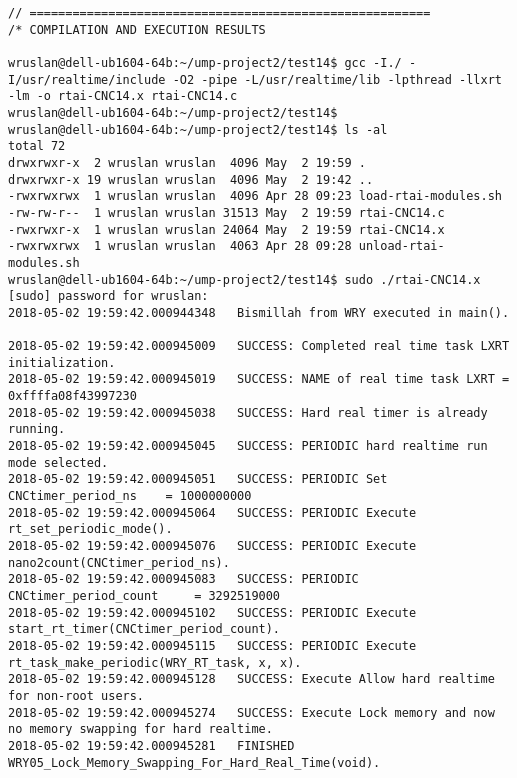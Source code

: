 \begin{landscape}
	

\begin{lstlisting}[caption={C/C++ Code excerpt for Real Time (RTAI)}, label=C/C++-Code-excerpt-for-Real-Time-(RTAI)]
// ========================================================
/* COMPILATION AND EXECUTION RESULTS

wruslan@dell-ub1604-64b:~/ump-project2/test14$ gcc -I./ -I/usr/realtime/include -O2 -pipe -L/usr/realtime/lib -lpthread -llxrt -lm -o rtai-CNC14.x rtai-CNC14.c
wruslan@dell-ub1604-64b:~/ump-project2/test14$ 
wruslan@dell-ub1604-64b:~/ump-project2/test14$ ls -al
total 72
drwxrwxr-x  2 wruslan wruslan  4096 May  2 19:59 .
drwxrwxr-x 19 wruslan wruslan  4096 May  2 19:42 ..
-rwxrwxrwx  1 wruslan wruslan  4096 Apr 28 09:23 load-rtai-modules.sh
-rw-rw-r--  1 wruslan wruslan 31513 May  2 19:59 rtai-CNC14.c
-rwxrwxr-x  1 wruslan wruslan 24064 May  2 19:59 rtai-CNC14.x
-rwxrwxrwx  1 wruslan wruslan  4063 Apr 28 09:28 unload-rtai-modules.sh
wruslan@dell-ub1604-64b:~/ump-project2/test14$ sudo ./rtai-CNC14.x 
[sudo] password for wruslan: 
2018-05-02 19:59:42.000944348 	Bismillah from WRY executed in main().

2018-05-02 19:59:42.000945009 	SUCCESS: Completed real time task LXRT initialization.
2018-05-02 19:59:42.000945019 	SUCCESS: NAME of real time task LXRT = 0xffffa08f43997230
2018-05-02 19:59:42.000945038 	SUCCESS: Hard real timer is already running.
2018-05-02 19:59:42.000945045 	SUCCESS: PERIODIC hard realtime run mode selected.
2018-05-02 19:59:42.000945051 	SUCCESS: PERIODIC Set CNCtimer_period_ns 	= 1000000000 
2018-05-02 19:59:42.000945064 	SUCCESS: PERIODIC Execute rt_set_periodic_mode().
2018-05-02 19:59:42.000945076 	SUCCESS: PERIODIC Execute nano2count(CNCtimer_period_ns).
2018-05-02 19:59:42.000945083 	SUCCESS: PERIODIC CNCtimer_period_count 	= 3292519000 
2018-05-02 19:59:42.000945102 	SUCCESS: PERIODIC Execute start_rt_timer(CNCtimer_period_count).
2018-05-02 19:59:42.000945115 	SUCCESS: PERIODIC Execute rt_task_make_periodic(WRY_RT_task, x, x).
2018-05-02 19:59:42.000945128 	SUCCESS: Execute Allow hard realtime for non-root users.
2018-05-02 19:59:42.000945274 	SUCCESS: Execute Lock memory and now no memory swapping for hard realtime.
2018-05-02 19:59:42.000945281 	FINISHED WRY05_Lock_Memory_Swapping_For_Hard_Real_Time(void).


\end{lstlisting}
\end{landscape}
